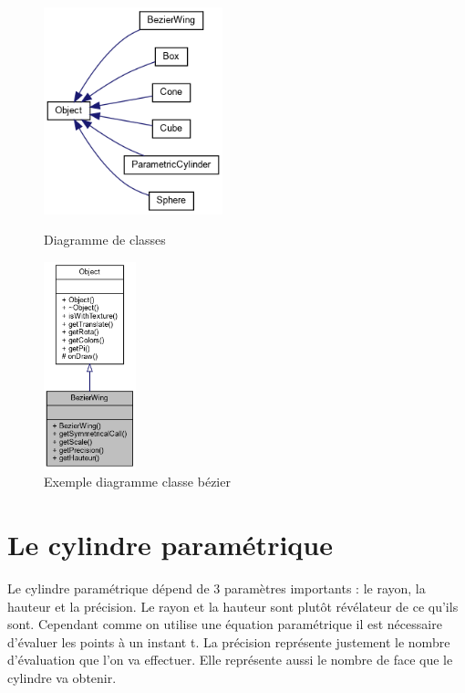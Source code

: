 \documentclass{article}
\begin{document}
\begin{figure}[!htb]
	\begin{minipage}{0.5\textwidth}
    	\centering
    	\includegraphics[height=6cm]{./assets/class_hierarchy.png}
    	\caption{Diagramme de classes}
	\end{minipage}
	\hfill
	\begin{minipage}{0.5\textwidth}
    	\centering
    	\includegraphics[height=6cm]{./assets/class_hierarchy_bezier.png}
    	\caption{Exemple diagramme classe bézier}
	\end{minipage}
\end{figure}



\section{Le cylindre paramétrique}

Le cylindre paramétrique dépend de 3 paramètres importants : le rayon, la hauteur et la précision. Le rayon et la hauteur sont plutôt révélateur de ce qu'ils sont. Cependant comme on utilise une équation paramétrique il est nécessaire d'évaluer les points à un instant t. La précision représente justement le nombre d'évaluation que l'on va effectuer. Elle représente aussi le nombre de face que le cylindre va obtenir. 
\end{document}
